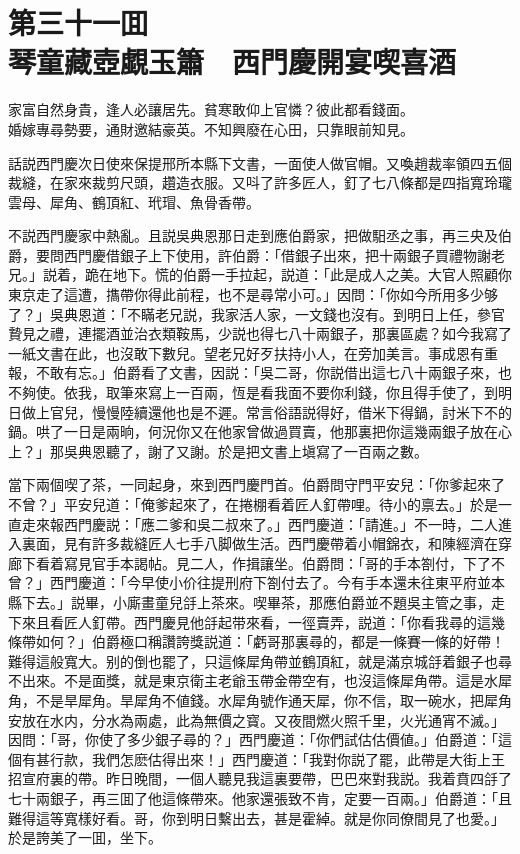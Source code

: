 
\chapter*{第三十一囬　\\琴童藏壺覷玉簫　西門慶開宴喫喜酒}


\begin{myquote}
家富自然身貴，逢人必讓居先。貧寒敢仰上官憐？彼此都看錢面。\\
婚嫁專尋勢要，通財邀結豪英。不知興廢在心田，只靠眼前知見。
\end{myquote}

話説西門慶次日使來保提邢所本縣下文書，一面使人做官帽。又喚趙裁率領四五個裁縫，在家來裁剪尺頭，趲造衣服。又呌了許多匠人，釘了七八條都是四指寬玲瓏雲母、犀角、鶴頂紅、玳瑁、魚骨香帶。

不説西門慶家中熱亂。且説吳典恩那日走到應伯爵家，把做馹丞之事，再三央及伯爵，要問西門慶借銀子上下使用，許伯爵：「借銀子出來，把十兩銀子買禮物謝老兄。」説着，跪在地下。慌的伯爵一手拉起，説道：「此是成人之美。大官人照顧你東京走了這遭，㩦帶你得此前程，也不是尋常小可。」因問：「你如今所用多少够了？」吳典恩道：「不瞞老兄説，我家活人家，一文錢也沒有。到明日上任，參官贄見之禮，連擺酒並治衣類鞍馬，少説也得七八十兩銀子，那裏區處？如今我寫了一紙文書在此，也沒敢下數兒。望老兄好歹扶持小人，在旁加美言。事成恩有重報，不敢有忘。」伯爵看了文書，因説：「吳二哥，你説借出這七八十兩銀子來，也不夠使。依我，取筆來寫上一百兩，恆是看我面不要你利錢，你且得手使了，到明日做上官兒，慢慢陸續還他也是不遲。常言俗語説得好，借米下得鍋，討米下不的鍋。哄了一日是兩晌，何況你又在他家曾做過買賣，他那裏把你這幾兩銀子放在心上？」那吳典恩聽了，謝了又謝。於是把文書上塡寫了一百兩之數。

當下兩個喫了茶，一同起身，來到西門慶門首。伯爵問守門平安兒：「你爹起來了不曾？」平安兒道：「俺爹起來了，在捲棚看着匠人釘帶哩。待小的禀去。」於是一直走來報西門慶説：「應二爹和吳二叔來了。」西門慶道：「請進。」不一時，二人進入裏面，見有許多裁縫匠人七手八脚做生活。西門慶帶着小帽錦衣，和陳經濟在穿廊下看着寫見官手本謁帖。見二人，作揖讓坐。伯爵問：「哥的手本劄付，下了不曾？」西門慶道：「今早使小价往提刑府下劄付去了。今有手本還未往東平府並本縣下去。」説畢，小廝畫童兒㧱上茶來。喫畢茶，那應伯爵並不題吳主管之事，走下來且看匠人釘帶。西門慶見他㧱起带來看，一徑賣弄，説道：「你看我尋的這幾條帶如何？」伯爵極口稱讚誇獎説道：「虧哥那裏尋的，都是一條賽一條的好帶！難得這般寬大。别的倒也罷了，只這條犀角帶並鶴頂紅，就是滿京城㧱着銀子也尋不出來。不是面獎，就是東京衛主老爺玉帶金帶空有，也沒這條犀角帶。這是水犀角，不是旱犀角。旱犀角不値錢。水犀角號作通天犀，你不信，取一碗水，把犀角安放在水内，分水為兩處，此為無價之寳。又夜間燃火照千里，火光通宵不滅。」因問：「哥，你使了多少銀子尋的？」西門慶道：「你們試估估價値。」伯爵道：「這個有甚行款，我們怎麽估得出來！」西門慶道：「我對你説了罷，此帶是大街上王招宣府裏的帶。昨日晚間，一個人聽見我這裏要帶，巴巴來對我説。我着賁四㧱了七十兩銀子，再三囬了他這條帶來。他家還張致不肯，定要一百兩。」伯爵道：「且難得這等寬樣好看。哥，你到明日繫出去，甚是霍綽。就是你同僚間見了也愛。」於是誇美了一囬，坐下。

